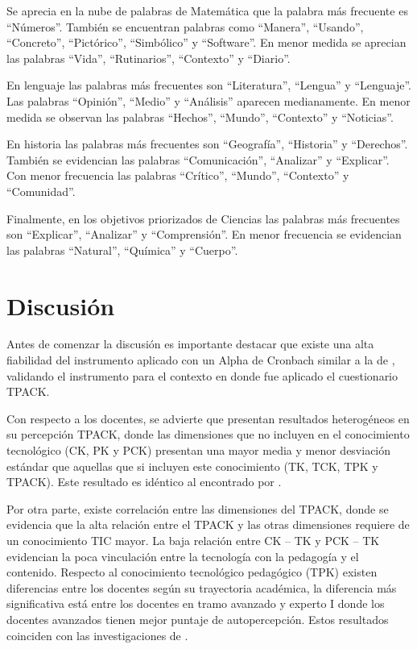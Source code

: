 \documentclass[spanish]{textolivre}
\begin{document}
Se aprecia en la nube de palabras de Matemática que la palabra más frecuente es “Números”. También se encuentran palabras como “Manera”, “Usando”, “Concreto”, “Pictórico”, “Simbólico” y “Software”. En menor medida se aprecian las palabras “Vida”, “Rutinarios”, “Contexto” y “Diario”. 

En lenguaje las palabras más frecuentes son “Literatura”, “Lengua” y “Lenguaje”. Las palabras “Opinión”, “Medio” y “Análisis” aparecen medianamente. En menor medida se observan las palabras “Hechos”, “Mundo”, “Contexto” y “Noticias”. 

En historia las palabras más frecuentes son “Geografía”, “Historia” y “Derechos”. También se evidencian las palabras “Comunicación”, “Analizar” y “Explicar”. Con menor frecuencia las palabras “Crítico”, “Mundo”, “Contexto” y “Comunidad”. 

Finalmente, en los objetivos priorizados de Ciencias las palabras más frecuentes son “Explicar”, “Analizar” y “Comprensión”. En menor frecuencia se evidencian las palabras “Natural”, “Química” y “Cuerpo”.

\section{Discusión}\label{sec-equacao}
Antes de comenzar la discusión es importante destacar que existe una alta fiabilidad del instrumento aplicado con un Alpha de Cronbach similar a la de \textcite{tapia_silva_conocimiento_2019}, validando el instrumento para el contexto en donde fue aplicado el cuestionario TPACK.

Con respecto a los docentes, se advierte que presentan resultados heterogéneos en su percepción TPACK, donde las dimensiones que no incluyen en el conocimiento tecnológico (CK, PK y PCK) presentan una mayor media y menor desviación estándar que aquellas que si incluyen este conocimiento (TK, TCK, TPK y TPACK). Este resultado es idéntico al encontrado por \textcite{tapia_silva_conocimiento_2019}.

Por otra parte, existe correlación entre las dimensiones del TPACK, donde se evidencia que la alta relación entre el TPACK y las otras dimensiones requiere de un conocimiento TIC mayor. La baja relación entre CK – TK y PCK – TK evidencian la poca vinculación entre la tecnología con la pedagogía y el contenido. Respecto al conocimiento tecnológico pedagógico (TPK) existen diferencias entre los docentes según su trayectoria académica, la diferencia más significativa está entre los docentes en tramo avanzado y experto I donde los docentes avanzados tienen mejor puntaje de autopercepción. Estos resultados coinciden con las investigaciones de \textcite{castera_self-reported_2020,ladron-de-guevara_moreno_conocimiento_2019}. 
\end{document}
